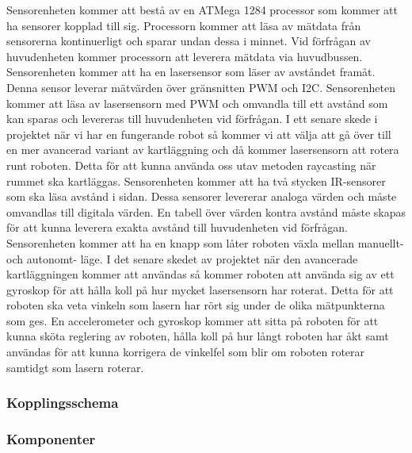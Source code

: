 \documentclass{article}
\begin{document}
Sensorenheten kommer att bestå av en ATMega 1284 processor som kommer att ha sensorer kopplad till sig. Processorn kommer att läsa av mätdata från sensorerna kontinuerligt och sparar undan dessa i minnet. Vid förfrågan av huvudenheten kommer processorn att leverera mätdata via huvudbussen. 
\newline\newline
Sensorenheten kommer att ha en lasersensor som läser av avståndet framåt. Denna sensor leverar mätvärden över gränsnitten PWM och I2C. Sensorenheten kommer att läsa av lasersensorn med PWM och omvandla till ett avstånd som kan sparas och levereras till huvudenheten vid förfrågan. I ett senare skede i projektet när vi har en fungerande robot så kommer vi att välja att gå över till en mer avancerad variant av kartläggning och då kommer lasersensorn att rotera runt roboten. Detta för att kunna använda oss utav metoden raycasting när rummet ska kartläggas.
\newline\newline
Sensorenheten kommer att ha två stycken IR-sensorer som ska läsa avstånd i sidan. Dessa sensorer levererar analoga värden och måste omvandlas till digitala värden. En tabell över värden kontra avstånd måste skapas för att kunna leverera exakta avstånd till huvudenheten vid förfrågan. 
\newline\newline
Sensorenheten kommer att ha en knapp som låter roboten växla mellan manuellt- och autonomt- läge.
\newline\newline
I det senare skedet av projektet när den avancerade kartläggningen kommer att användas så kommer roboten att använda sig av ett gyroskop för att hålla koll på hur mycket lasersensorn har roterat. Detta för att roboten ska veta vinkeln som lasern har rört sig under de olika mätpunkterna som ges.
\newline\newline
En accelerometer och gyroskop kommer att sitta på roboten för att kunna sköta reglering av roboten, hålla koll på hur långt roboten har åkt samt användas för att kunna korrigera de vinkelfel som blir om roboten roterar samtidgt som lasern roterar.

\subsubsection{Kopplingsschema}

\subsubsection{Komponenter}
\end{document}
